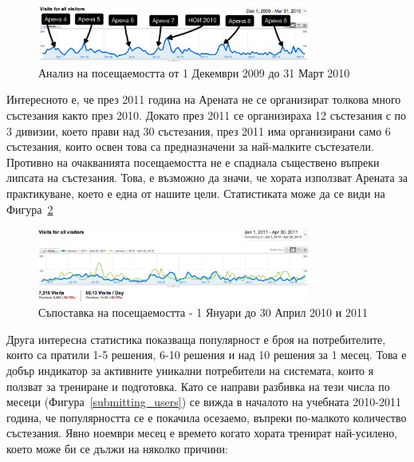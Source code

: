 \documentclass[a4paper,12pt]{article}
\begin{document}
  \begin{figure}[ht]
    \begin{center}
      \includegraphics[width=0.8\textwidth]{images/visits_on_contests.png}
    \end{center}
    \caption{Анализ на посещаемостта от 1 Декември 2009 до 31 Март 2010}
    \label{visits_on_contests}
  \end{figure}

  Интересното е, че през 2011 година на Арената не се организират толкова много състезания както през 2010. Докато през 2011 се организираха 12 състезания с по 3 дивизии, което прави над 30 състезания, през 2011 има организирани само 6 състезания, които освен това са предназначени за най-малките състезатели. Противно на очакванията посещаемостта не е спаднала съществено въпреки липсата на състезания. Това, е възможно да значи, че хората използват Арената за практикуване, което е една от нашите цели. Статистиката може да се види на Фигура~\ref{visits_comparison}

  \begin{figure}[ht]
    \begin{center}
      \includegraphics[width=0.8\textwidth]{images/visits_comparison.png}
    \end{center}
    \caption{Съпоставка на посещаемостта - 1 Януари до 30 Април 2010 и 2011}
    \label{visits_comparison}
  \end{figure}
  
  Друга интересна статистика показваща популярност е броя на потребителите, които са пратили 1-5 решения, 6-10 решения и над 10 решения за 1 месец. Това е добър индикатор за активните уникални потребители на системата, които я ползват за трениране и подготовка. Като се направи разбивка на тези числа по месеци (Фигура~\ref{submitting_users}) се вижда в началото на учебната 2010-2011 година, че популярността се е покачила осезаемо, въпреки по-малкото количество състезания. Явно ноември месец е времето когато хората тренират най-усилено, което може би се дължи на няколко причини:
  
\end{document}
